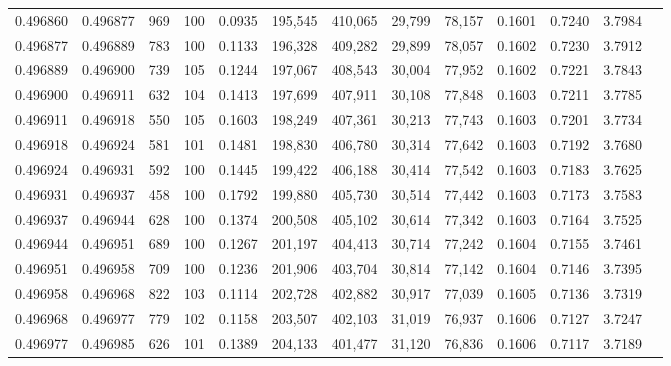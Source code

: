 \begin{tabular}{rrrrrrrrrrrrr}
0.496860 & 0.496877 &   969 & 100 &                                     0.0935 & 195,545 & 410,065 &  29,799 &  78,157 & 0.1601 & 0.7240 & 3.7984 \\
0.496877 & 0.496889 &   783 & 100 &                                     0.1133 & 196,328 & 409,282 &  29,899 &  78,057 & 0.1602 & 0.7230 & 3.7912 \\
0.496889 & 0.496900 &   739 & 105 &                                     0.1244 & 197,067 & 408,543 &  30,004 &  77,952 & 0.1602 & 0.7221 & 3.7843 \\
0.496900 & 0.496911 &   632 & 104 &                                     0.1413 & 197,699 & 407,911 &  30,108 &  77,848 & 0.1603 & 0.7211 & 3.7785 \\
0.496911 & 0.496918 &   550 & 105 &                                     0.1603 & 198,249 & 407,361 &  30,213 &  77,743 & 0.1603 & 0.7201 & 3.7734 \\
0.496918 & 0.496924 &   581 & 101 &                                     0.1481 & 198,830 & 406,780 &  30,314 &  77,642 & 0.1603 & 0.7192 & 3.7680 \\
0.496924 & 0.496931 &   592 & 100 &                                     0.1445 & 199,422 & 406,188 &  30,414 &  77,542 & 0.1603 & 0.7183 & 3.7625 \\
0.496931 & 0.496937 &   458 & 100 &                                     0.1792 & 199,880 & 405,730 &  30,514 &  77,442 & 0.1603 & 0.7173 & 3.7583 \\
0.496937 & 0.496944 &   628 & 100 &                                     0.1374 & 200,508 & 405,102 &  30,614 &  77,342 & 0.1603 & 0.7164 & 3.7525 \\
0.496944 & 0.496951 &   689 & 100 &                                     0.1267 & 201,197 & 404,413 &  30,714 &  77,242 & 0.1604 & 0.7155 & 3.7461 \\
0.496951 & 0.496958 &   709 & 100 &                                     0.1236 & 201,906 & 403,704 &  30,814 &  77,142 & 0.1604 & 0.7146 & 3.7395 \\
0.496958 & 0.496968 &   822 & 103 &                                     0.1114 & 202,728 & 402,882 &  30,917 &  77,039 & 0.1605 & 0.7136 & 3.7319 \\
0.496968 & 0.496977 &   779 & 102 &                                     0.1158 & 203,507 & 402,103 &  31,019 &  76,937 & 0.1606 & 0.7127 & 3.7247 \\
0.496977 & 0.496985 &   626 & 101 &                                     0.1389 & 204,133 & 401,477 &  31,120 &  76,836 & 0.1606 & 0.7117 & 3.7189 \\

\end{tabular}

